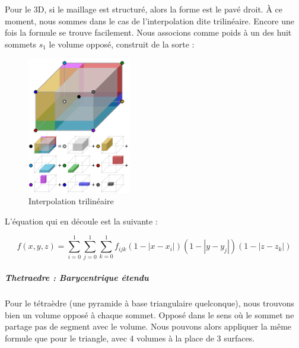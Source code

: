 Pour le 3D, si le maillage est structuré, alors la forme est le pavé droit. À ce moment, nous sommes dans le cas de l'interpolation dite trilinéaire. Encore une fois la formule se trouve facilement. Nous associons comme poids à un des huit sommets \( s_1 \) le volume opposé, construit de la sorte :

\begin{figure}[ht!]
    \centering
    \includegraphics[width=0.4\textwidth]{images/Trilinear_interpolation_visualisation.svg.png}
    \caption{Interpolation trilinéaire} %
\end{figure}

L'équation qui en découle est la suivante :

\begin{equation}
    f(x, y, z) = \sum_{i=0}^{1} \sum_{j=0}^{1} \sum_{k=0}^{1} f_{ijk} (1 - |x - x_i|)(1 - |y - y_j|)(1 - |z - z_k|)
\end{equation}



\subparagraph{Thetraedre : Barycentrique étendu}

Pour le tétraèdre (une pyramide à base triangulaire quelconque), nous trouvons bien un volume opposé à chaque sommet. Opposé dans le sens où le sommet ne partage pas de segment avec le volume. Nous pouvons alors appliquer la même formule que pour le triangle, avec 4 volumes à la place de 3 surfaces.

